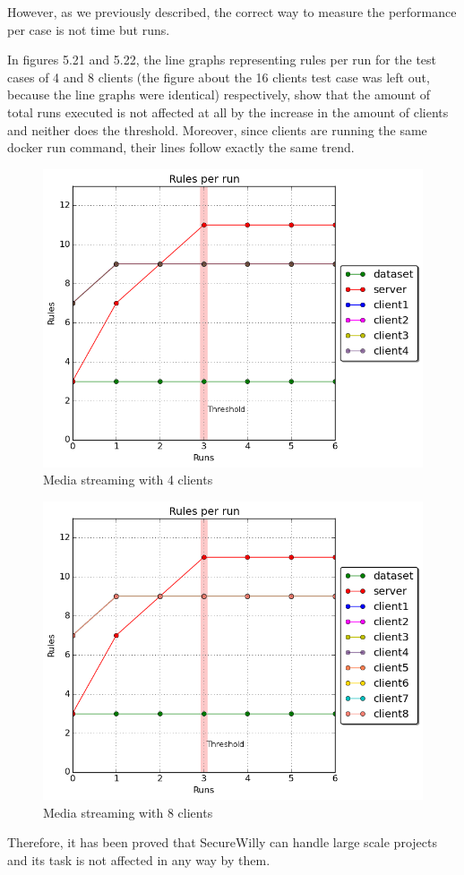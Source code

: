 However, as we previously described, the correct way to measure the performance per case is not time but runs.

In figures 5.21 and 5.22, the line graphs representing rules per run for the test cases of 4 and 8 clients (the figure about the 16 clients test case was left out, because the line graphs were identical) respectively, show that the amount of total runs executed is not affected at all by the increase in the amount of clients and neither does the threshold. Moreover, since clients are running the same docker run command, their lines follow exactly the same trend.

\begin{figure}[h!]
  \centering
   \includegraphics[width=0.65\linewidth]{figures/scalability/rules_4_t.png}
   \caption{Media streaming with 4 clients}
\end{figure}
\hfill\break\hfill\break
\begin{figure}[h!]
  \centering
   \includegraphics[width=0.68\linewidth]{figures/scalability/rules_8_t.png}
   \caption{Media streaming with 8 clients}
\end{figure}

Therefore, it has been proved that SecureWilly can handle large scale projects and its task is not affected in any way by them.

